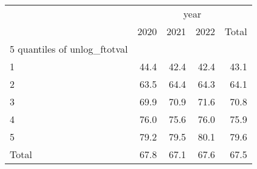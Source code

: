 \begin{tabular}{lllll}
\cline{1-5}
\multicolumn{1}{c}{} &
  \multicolumn{4}{|c}{year} \\
\multicolumn{1}{c}{} &
  \multicolumn{1}{|r}{2020} &
  \multicolumn{1}{r}{2021} &
  \multicolumn{1}{r}{2022} &
  \multicolumn{1}{r}{Total} \\
\cline{1-5}
\multicolumn{1}{l}{5 quantiles of unlog\_ftotval} &
  \multicolumn{1}{|r}{} &
  \multicolumn{1}{r}{} &
  \multicolumn{1}{r}{} &
  \multicolumn{1}{r}{} \\
\multicolumn{1}{l}{\hspace{1em}1} &
  \multicolumn{1}{|r}{44.4} &
  \multicolumn{1}{r}{42.4} &
  \multicolumn{1}{r}{42.4} &
  \multicolumn{1}{r}{43.1} \\
\multicolumn{1}{l}{\hspace{1em}2} &
  \multicolumn{1}{|r}{63.5} &
  \multicolumn{1}{r}{64.4} &
  \multicolumn{1}{r}{64.3} &
  \multicolumn{1}{r}{64.1} \\
\multicolumn{1}{l}{\hspace{1em}3} &
  \multicolumn{1}{|r}{69.9} &
  \multicolumn{1}{r}{70.9} &
  \multicolumn{1}{r}{71.6} &
  \multicolumn{1}{r}{70.8} \\
\multicolumn{1}{l}{\hspace{1em}4} &
  \multicolumn{1}{|r}{76.0} &
  \multicolumn{1}{r}{75.6} &
  \multicolumn{1}{r}{76.0} &
  \multicolumn{1}{r}{75.9} \\
\multicolumn{1}{l}{\hspace{1em}5} &
  \multicolumn{1}{|r}{79.2} &
  \multicolumn{1}{r}{79.5} &
  \multicolumn{1}{r}{80.1} &
  \multicolumn{1}{r}{79.6} \\
\multicolumn{1}{l}{\hspace{1em}Total} &
  \multicolumn{1}{|r}{67.8} &
  \multicolumn{1}{r}{67.1} &
  \multicolumn{1}{r}{67.6} &
  \multicolumn{1}{r}{67.5} \\
\cline{1-5}
\end{tabular}
